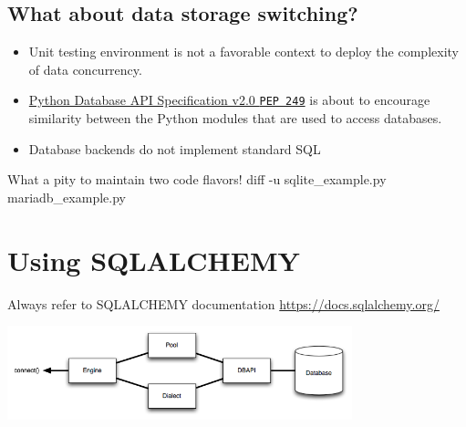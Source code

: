 \documentclass[english]{beamer}
\newcommand{\PROGRAMDIR}{data}
\begin{document}
\subsection{What about data storage switching?}
\begin{frame}
    \begin{itemize}
    \item Unit testing environment is not a favorable context to deploy the
        complexity of data concurrency.
    \item \href{https://peps.python.org/pep-0249/}{Python Database API
            Specification v2.0 \texttt{PEP 249}} is about to encourage
        similarity between the Python modules that are used to access
        databases.
    \item Database backends do not implement standard \gls{SQL}
    \end{itemize}
\end{frame}
\begin{frame}[containsverbatim]
    What a pity to maintain two code flavors!
    \bash[ignoreExitCode,ignoreStderr,prefix={}]
diff -u sqlite_example.py mariadb_example.py
\END
    \lstset{basicstyle=\scriptsize\ttfamily,language=diff,numbers=none}
    \begin{center}
        \resizebox{\textwidth}{!}{%
            
        }
    \end{center}
\end{frame}

\section{Using \gls{SQLALCHEMY}}
\begin{frame}
    \tableofcontents[current]
\end{frame}
\begin{frame}
    Always refer to \gls{SQLALCHEMY} documentation
    \url{https://docs.sqlalchemy.org/}
\end{frame}
\begin{frame}
    \begin{center}
        \includegraphics[width=0.75\textwidth]{data/sqla_engine_arch.png}
    \end{center}
\end{frame}
\end{document}
